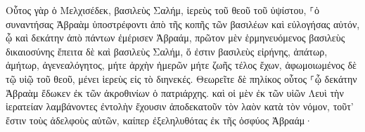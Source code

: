 \documentclass{openreader}
\begin{document}
Οὗτος γὰρ ὁ Μελχισέδεκ, βασιλεὺς Σαλήμ, ἱερεὺς τοῦ θεοῦ τοῦ ὑψίστου, ⸀ὁ συναντήσας Ἀβραὰμ ὑποστρέφοντι ἀπὸ τῆς κοπῆς τῶν βασιλέων καὶ εὐλογήσας αὐτόν, 
ᾧ καὶ δεκάτην ἀπὸ πάντων ἐμέρισεν Ἀβραάμ, πρῶτον μὲν ἑρμηνευόμενος βασιλεὺς δικαιοσύνης ἔπειτα δὲ καὶ βασιλεὺς Σαλήμ, ὅ ἐστιν βασιλεὺς εἰρήνης, 
ἀπάτωρ, ἀμήτωρ, ἀγενεαλόγητος, μήτε ἀρχὴν ἡμερῶν μήτε ζωῆς τέλος ἔχων, ἀφωμοιωμένος δὲ τῷ υἱῷ τοῦ θεοῦ, μένει ἱερεὺς εἰς τὸ διηνεκές. 
Θεωρεῖτε δὲ πηλίκος οὗτος ⸀ᾧ δεκάτην Ἀβραὰμ ἔδωκεν ἐκ τῶν ἀκροθινίων ὁ πατριάρχης. 
καὶ οἱ μὲν ἐκ τῶν υἱῶν Λευὶ τὴν ἱερατείαν λαμβάνοντες ἐντολὴν ἔχουσιν ἀποδεκατοῦν τὸν λαὸν κατὰ τὸν νόμον, τοῦτ’ ἔστιν τοὺς ἀδελφοὺς αὐτῶν, καίπερ ἐξεληλυθότας ἐκ τῆς ὀσφύος Ἀβραάμ· 
\end{document}
